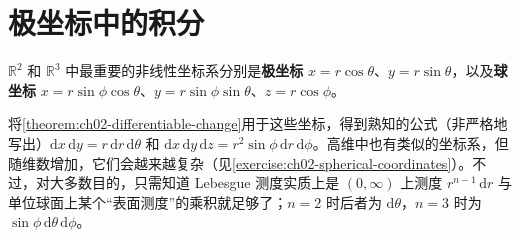 \documentclass[../../main.tex]{subfiles}%
\begin{document}
\section{极坐标中的积分}\label{section:ch02-polar-coordinates}
\begin{definition}[平面极坐标与球坐标]\label{definition:ch02-planar-spherical-coordinates}
$\mathbb{R}^2$ 和 $\mathbb{R}^3$ 中最重要的非线性坐标系分别是\textbf{极坐标} $x=r\cos\theta$、$y=r\sin\theta$，以及\textbf{球坐标} $x=r\sin\phi\cos\theta$、$y=r\sin\phi\sin\theta$、$z=r\cos\phi$。
\end{definition}
将\cref{theorem:ch02-differentiable-change}用于这些坐标，得到熟知的公式（非严格地写出）$\mathrm{d}x\,\mathrm{d}y=r\,\mathrm{d}r\,\mathrm{d}\theta$ 和 $\mathrm{d}x\,\mathrm{d}y\,\mathrm{d}z=r^2\sin\phi\,\mathrm{d}r\,\mathrm{d}\phi$。高维中也有类似的坐标系，但随维数增加，它们会越来越复杂（见\cref{exercise:ch02-spherical-coordinates}）。不过，对大多数目的，只需知道 Lebesgue 测度实质上是 $(0,\infty)$ 上测度 $r^{n-1}\,\mathrm{d}r$ 与单位球面上某个“表面测度”的乘积就足够了；$n=2$ 时后者为 $\mathrm{d}\theta$，$n=3$ 时为 $\sin\phi\,\mathrm{d}\theta\,\mathrm{d}\phi$。
\end{document}
